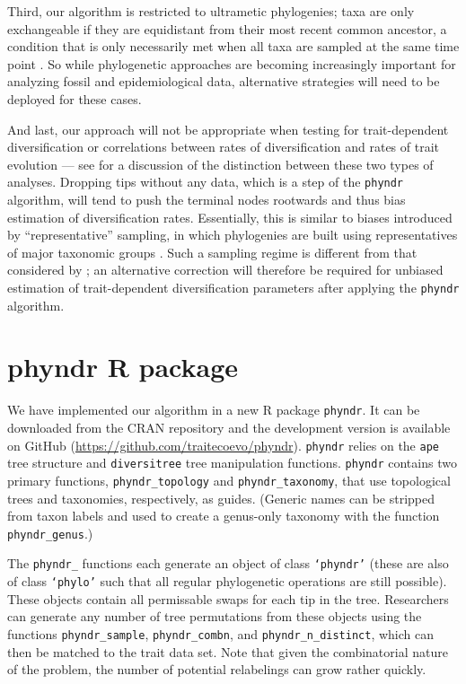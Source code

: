\documentclass[a4paper,11pt]{article}
\newcommand{\phyndr}{\tt phyndr}
\begin{document}
Third, our algorithm is restricted to ultrametic phylogenies; taxa are only exchangeable if they are equidistant from their most recent common ancestor, a condition that is only necessarily met when all taxa are sampled at the same time point \citep[see][for more discussion of this point and its implications for models of trait evolution]{SlaterMEE}. So while phylogenetic approaches are becoming increasingly important for analyzing fossil and epidemiological data, alternative strategies will need to be deployed for these cases.

And last, our approach will not be appropriate when testing for trait-dependent diversification \citep[e.g.,][]{Maddison2007, FitzJohn2012} or correlations between rates of diversification and rates of trait evolution \citep[e.g.,][]{Rabosky2013, Rabosky2014} --- see \citealt{PennellPE} for a discussion of the distinction between these two types of analyses. Dropping tips without any data, which is a step of the {\phyndr} algorithm, will tend to push the terminal nodes rootwards and thus bias estimation of diversification rates. Essentially, this is similar to biases introduced by ``representative'' sampling, in which phylogenies are built using representatives of major taxonomic groups \citep{Hohna2011, Stadler2013}. Such a sampling regime is different from that considered by \citet{FitzJohn2009}; an alternative correction will therefore be required for unbiased estimation of trait-dependent diversification parameters after applying the {\phyndr} algorithm. 

\section{phyndr R package}

We have implemented our algorithm in a new R package {\phyndr}. It can be downloaded from the CRAN repository and the development version is available on GitHub (\url{https://github.com/traitecoevo/phyndr}). {\phyndr} relies on the \texttt{ape} \citep{ape} tree structure and \texttt{diversitree} \citep{FitzJohn2012} tree manipulation functions. {\phyndr} contains two primary functions, \texttt{phyndr\_topology} and \texttt{phyndr\_taxonomy}, that use topological trees and taxonomies, respectively, as guides. (Generic names can be stripped from taxon labels and used to create a genus-only taxonomy with the function \texttt{phyndr\_genus}.)
 
The \texttt{phyndr\_} functions each generate an object of class \texttt{`phyndr'} (these are also of class \texttt{`phylo'} such that all regular phylogenetic operations are still possible). These objects contain all permissable swaps for each tip in the tree. Researchers can generate any number of tree permutations from these objects using the functions \texttt{phyndr\_sample}, \texttt{phyndr\_combn}, and \texttt{phyndr\_n\_distinct}, which can then be matched to the trait data set.  Note that given the combinatorial nature of the problem, the number of potential relabelings can grow rather quickly.
\end{document}
